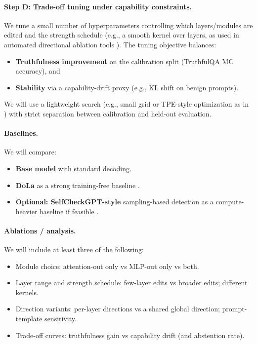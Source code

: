 \paragraph{Step D: Trade-off tuning under capability constraints.}
We tune a small number of hyperparameters controlling which layers/modules are edited and the strength schedule (e.g., a smooth kernel over layers, as used in automated directional ablation tools \citep{heretic}). The tuning objective balances:
\begin{itemize}
  \item \textbf{Truthfulness improvement} on the calibration split (TruthfulQA MC accuracy), and
  \item \textbf{Stability} via a capability-drift proxy (e.g., KL shift on benign prompts).
\end{itemize}
We will use a lightweight search (e.g., small grid or TPE-style optimization as in \citep{heretic}) with strict separation between calibration and held-out evaluation.

\paragraph{Baselines.}
We will compare:
\begin{itemize}
  \item \textbf{Base model} with standard decoding.
  \item \textbf{DoLa} as a strong training-free baseline \citep{chuang2024dola}.
  \item \textbf{Optional: SelfCheckGPT-style} sampling-based detection as a compute-heavier baseline if feasible \citep{manakul2023selfcheckgpt}.
\end{itemize}

\paragraph{Ablations / analysis.}
We will include at least three of the following:
\begin{itemize}
  \item Module choice: attention-out only vs MLP-out only vs both.
  \item Layer range and strength schedule: few-layer edits vs broader edits; different kernels.
  \item Direction variants: per-layer directions vs a shared global direction; prompt-template sensitivity.
  \item Trade-off curves: truthfulness gain vs capability drift (and abstention rate).
\end{itemize}

